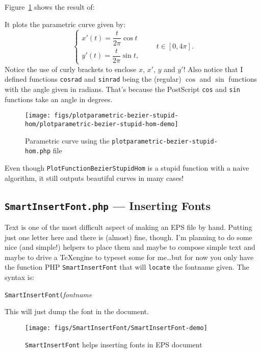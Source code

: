 \documentclass[10pt,a4paper]{scrartcl}
\newcommand\PS{PostScript}
\begin{document}
Figure~\ref{fig:plotparametric-bezier-stupid-hom-demo} shows the result of:

It plots the parametric curve given by:
\[\begin{cases}
x'(t)=\dfrac t{2\pi}\cos t\\
y'(t)=\dfrac t{2\pi}\sin t,
\end{cases}\qquad t\in[0,4\pi].\]
Notice the use of curly brackets to enclose $x$, $x'$, $y$ and $y'$! Also notice that I
defined functions \texttt{cosrad} and \texttt{sinrad} being the (regular)
$\cos$ and $\sin$ functions with the angle given in radians. That's because the
\PS{} \texttt{cos} and \texttt{sin} functions take an angle in degrees.

\begin{figure}[ht!]%
\centering
\texttt{[image: figs/plotparametric-bezier-stupid-hom/plotparametric-bezier-stupid-hom-demo]}%
\caption{Parametric curve using the \texttt{plotparametric-bezier-stupid-hom.php} file}%
\label{fig:plotparametric-bezier-stupid-hom-demo}%
\end{figure}

Even though \texttt{PlotFunctionBezierStupidHom} is a stupid function with a
naive algorithm, it still outputs beautiful curves in many cases!

\subsection{\texttt{SmartInsertFont.php} --- Inserting Fonts}
\label{ssec:SmartInsertFont.php}
Text is one of the most difficult aspect of making an EPS file by hand. Putting
just one letter here and there is (almost) fine, though. I'm planning to do
some nice (and simple!) helpers to place them and maybe to compose simple text
and maybe to drive a \TeX engine to typeset some for me\ldots but for now you
only have the function PHP \texttt{SmartInsertFont} that will \texttt{locate}
the fontname given. The syntax is:
\begin{center}
\texttt{SmartInsertFont\quad(}\quad\textit{fontname}\quad{)}
\end{center}
This will just dump the font in the document.
\begin{figure}[ht!]%
\centering
\texttt{[image: figs/SmartInsertFont/SmartInsertFont-demo]}%
\caption{\texttt{SmartInsertFont} helps inserting fonts in EPS document}%
\label{fig:SmartInsertFont-demo.php}%
\end{figure}
\end{document}
